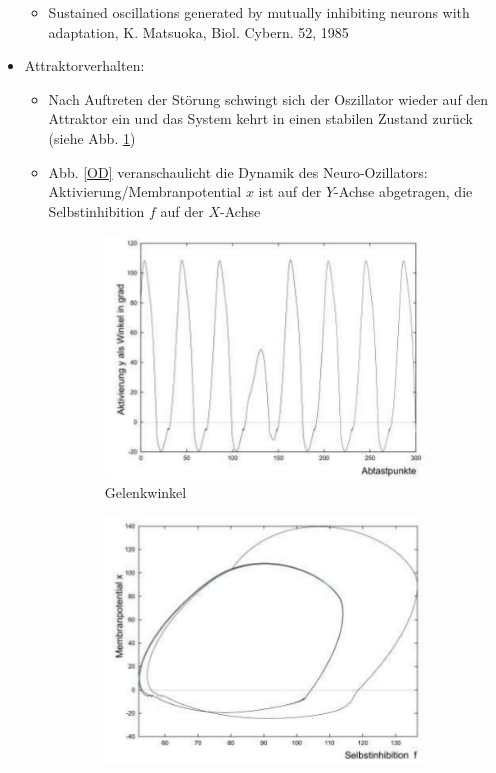 \begin{itemize}
\begin{itemize}
\item \glqq Sustained oscillations generated by mutually inhibiting neurons with adaptation\grqq , K. Matsuoka, Biol. Cybern. 52, 1985
\end{itemize}
\item Attraktorverhalten:
\begin{itemize}
\item Nach Auftreten der Störung schwingt sich der Oszillator wieder auf den Attraktor ein und das System kehrt in einen stabilen Zustand zurück (siehe Abb. \ref{GW})
\item Abb. \ref{OD} veranschaulicht die Dynamik des Neuro-Ozillators: Aktivierung/Membranpotential $x$ ist auf der $Y$-Achse abgetragen, die Selbstinhibition $f$ auf der $X$-Achse 
\end{itemize}
\begin{figure}[h!]
	\centering
	\begin{subfigure}{.4\textwidth}
		\includegraphics[width=\textwidth]{figures/ch05_gelenkwinkel.png}
		\caption{Gelenkwinkel}
		\label{GW}
	\end{subfigure}
	\begin{subfigure}{.4\textwidth}
		\includegraphics[width=\textwidth]{figures/ch05_oszillatordynamik.png}

\end{subfigure}
\end{figure}
\end{itemize}
